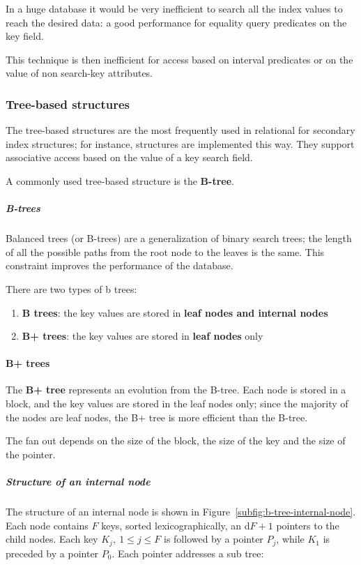 \documentclass[english]{article}
\begin{document}
In a huge database it would be very inefficient to search all the index values to reach the desired data:
a good performance for equality query predicates on the key field.

This technique is then inefficient for access based on interval predicates or on the value of non search-key attributes.

\subsubsection{Tree-based structures}

The tree-based structures are the most frequently used in relational \dbms for secondary index structures;
for instance, \sql structures are implemented this way.
They support associative access based on the value of a key search field.

A commonly used tree-based structure is the \textbf{B-tree}.

\subparagraph*{B-trees}
Balanced trees (or B-trees) are a generalization of binary search trees;
the length of all the possible paths from the root node to the leaves is the same.
This constraint improves the performance of the database.

There are two types of b trees:

\begin{enumerate}
  \item \textbf{B trees}: the key values are stored in \textbf{leaf nodes and internal nodes}
  \item \textbf{B+ trees}: the key values are stored in \textbf{leaf nodes} only
\end{enumerate}

\paragraph{B+ trees}

The \textbf{B+ tree} represents an evolution from the B-tree.
Each node is stored in a block, and the key values are stored in the leaf nodes only;
since the majority of the nodes are leaf nodes, the B+ tree is more efficient than the B-tree.

The fan out depends on the size of the block, the size of the key and the size of the pointer.

\subparagraph*{Structure of an internal node}
The structure of an internal node is shown in Figure~\ref{subfig:b-tree-internal-node}.
Each node contains \(F\) keys, sorted lexicographically, an d\(F + 1\) pointers to the child nodes.
Each key \(K_j, \ 1 \leq j \leq F\) is followed by a pointer \(P_j\), while \(K_1\) is preceded by a pointer \(P_0\).
Each pointer addresses a sub tree:
\end{document}

